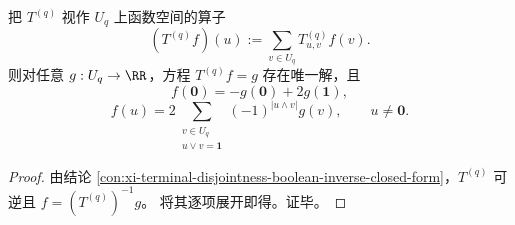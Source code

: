 \begin{conclusion}[互补 Möbius 反演：线性方程 \texorpdfstring{$T^{(q)}f=g$}{Tq f=g} 的显式求解]\label{con:xi-terminal-disjointness-complementary-mobius-inversion-linear-solve}
把 \(T^{(q)}\) 视作 \(U_q\) 上函数空间的算子
\[
(T^{(q)}f)(u):=\sum_{v\in U_q}T^{(q)}_{u,v}f(v).
\]
则对任意 \(g:U_q\to\RR\)，方程 \(T^{(q)}f=g\) 存在唯一解，且
\[
f(\mathbf 0)=-g(\mathbf 0)+2g(\mathbf 1),
\]
\[
f(u)=2\sum_{\substack{v\in U_q\\ u\vee v=\mathbf 1}}(-1)^{|u\wedge v|}g(v),
\qquad u\neq \mathbf 0.
\]
\end{conclusion}
\begin{proof}
由结论 \ref{con:xi-terminal-disjointness-boolean-inverse-closed-form}，\(T^{(q)}\) 可逆且
\(
f=(T^{(q)})^{-1}g
\)。
将其逐项展开即得。证毕。
\end{proof}



\endinput
